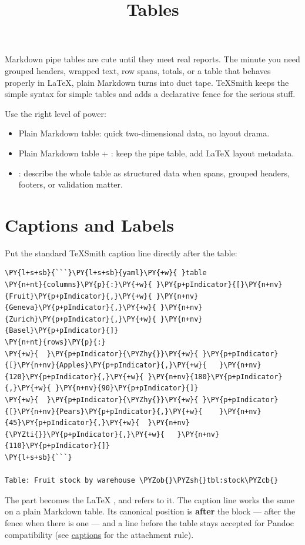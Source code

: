 \documentclass[a4paper,twoside]{article}
\title{Tables}
\author{}\date{}
\begin{document}
\maketitle
Markdown pipe tables are cute until they meet real reports. The minute you
need grouped headers, wrapped text, row spans, totals, or a table that behaves
properly in \LaTeX{}, plain Markdown turns into duct tape. TeXSmith keeps the
simple syntax for simple tables and adds a declarative  fence for
the serious stuff.

Use the right level of power:
\begin{itemize}
\item Plain Markdown table: quick two-dimensional data, no layout drama.
\item Plain Markdown table + : keep the pipe table, add \LaTeX{}
layout metadata.
\item {}: describe the whole table as structured data when spans,
grouped headers, footers, or validation matter.
\end{itemize}
\section{Captions and Labels}
Put the standard TeXSmith caption line directly after the table:
\begin{tscode}[lang=markdown, engine=pygments]
\begin{Verbatim}[commandchars=\\\{\},breaklines, breakanywhere, commandchars=\\\{\}]
\PY{l+s+sb}{```}\PY{l+s+sb}{yaml}\PY{+w}{ }table
\PY{n+nt}{columns}\PY{p}{:}\PY{+w}{ }\PY{p+pIndicator}{[}\PY{n+nv}{Fruit}\PY{p+pIndicator}{,}\PY{+w}{ }\PY{n+nv}{Geneva}\PY{p+pIndicator}{,}\PY{+w}{ }\PY{n+nv}{Zurich}\PY{p+pIndicator}{,}\PY{+w}{ }\PY{n+nv}{Basel}\PY{p+pIndicator}{]}
\PY{n+nt}{rows}\PY{p}{:}
\PY{+w}{  }\PY{p+pIndicator}{\PYZhy{}}\PY{+w}{ }\PY{p+pIndicator}{[}\PY{n+nv}{Apples}\PY{p+pIndicator}{,}\PY{+w}{   }\PY{n+nv}{120}\PY{p+pIndicator}{,}\PY{+w}{ }\PY{n+nv}{180}\PY{p+pIndicator}{,}\PY{+w}{ }\PY{n+nv}{90}\PY{p+pIndicator}{]}
\PY{+w}{  }\PY{p+pIndicator}{\PYZhy{}}\PY{+w}{ }\PY{p+pIndicator}{[}\PY{n+nv}{Pears}\PY{p+pIndicator}{,}\PY{+w}{    }\PY{n+nv}{45}\PY{p+pIndicator}{,}\PY{+w}{  }\PY{n+nv}{\PYZti{}}\PY{p+pIndicator}{,}\PY{+w}{   }\PY{n+nv}{110}\PY{p+pIndicator}{]}
\PY{l+s+sb}{```}

Table: Fruit stock by warehouse \PYZob{}\PYZsh{}tbl:stock\PYZcb{}
\end{Verbatim}
\end{tscode}
The  part becomes the \LaTeX{} , and 
refers to it. The caption line works the same on a plain Markdown table. Its
canonical position is \textbf{after} the block --- after the  fence when
there is one --- and a  line before the table stays accepted for Pandoc
compatibility (see \href{captions.md\#caption-lines-in-detail}{captions} for the
attachment rule).
\end{document}
